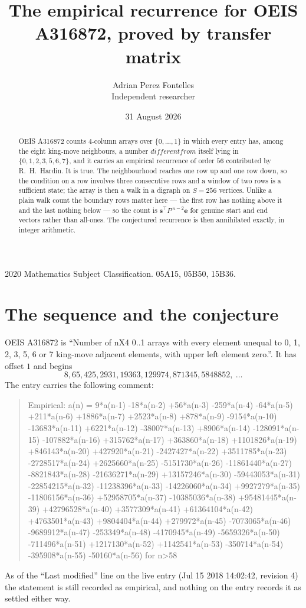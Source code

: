 \documentclass[11pt,a4paper]{article}
\title{The empirical recurrence for OEIS A316872, proved by transfer matrix}
\author{Adrian Perez Fontelles\\ \small Independent researcher}
\date{31 August 2026}
\theoremstyle{plain}
\theoremstyle{definition}
\begin{document}
\maketitle

\begin{abstract}
OEIS A316872 counts $4$-column arrays over $\{0,\dots,1\}$ in which every entry has,
among the eight king-move neighbours, a number $different from$ itself lying in $\{0,1,2,3,5,6,7\}$, and it carries an empirical
recurrence of order $56$ contributed by R.~H.~Hardin. It is true. The neighbourhood
reaches one row up and one row down, so the condition on a row involves three consecutive
rows and a window of two rows is a sufficient state; the array is then a walk in a digraph
on $S=256$ vertices. Unlike a plain walk count the boundary rows matter here --- the first
row has nothing above it and the last nothing below --- so the count is
$\mathbf{s}^{\!\top}P^{\,n-2}\mathbf{e}$ for genuine start and end vectors rather than
all-ones. The conjectured recurrence is then annihilated exactly, in integer arithmetic.
\end{abstract}

\noindent\small 2020 Mathematics Subject Classification. 05A15, 05B50, 15B36.\normalsize

\section{The sequence and the conjecture}

OEIS A316872 is ``Number of nX4 0..1 arrays with every element unequal to 0, 1, 2, 3, 5, 6 or 7 king-move adjacent elements, with upper left element zero.''. It has offset
$1$ and begins
\[
8, 65, 425, 2931, 19363, 129974, 871345, 5848852,\ \dots
\]
The entry carries the following comment:
\begin{quote}\small
Empirical: a(n) = 9*a(n-1) -18*a(n-2) +56*a(n-3) -259*a(n-4) -64*a(n-5) +211*a(n-6) +1886*a(n-7) +2523*a(n-8) +878*a(n-9) -9154*a(n-10) -13683*a(n-11) +6221*a(n-12) -38007*a(n-13) +8906*a(n-14) -128091*a(n-15) -107882*a(n-16) +315762*a(n-17) +363860*a(n-18) +1101826*a(n-19) +846143*a(n-20) +427920*a(n-21) -2427427*a(n-22) +3511785*a(n-23) -2728517*a(n-24) +2625660*a(n-25) -5151730*a(n-26) -11861440*a(n-27) -8821843*a(n-28) -21636271*a(n-29) +13157246*a(n-30) -59443053*a(n-31) -22854215*a(n-32) -11238396*a(n-33) -14226060*a(n-34) +9927279*a(n-35) -11806156*a(n-36) +52958705*a(n-37) -10385036*a(n-38) +95481445*a(n-39) +42796528*a(n-40) +3577309*a(n-41) +61364104*a(n-42) +4763501*a(n-43) +9804404*a(n-44) +279972*a(n-45) -7073065*a(n-46) -9689912*a(n-47) -253349*a(n-48) -4170945*a(n-49) -5659326*a(n-50) -711496*a(n-51) +1217130*a(n-52) +1142541*a(n-53) -350714*a(n-54) -395908*a(n-55) -50160*a(n-56) for n>58
\end{quote}
As of the ``Last modified'' line on the live entry (Jul 15 2018 14:02:42, revision
4) the statement is still recorded as empirical, and nothing on the entry
records it as settled either way.
\end{document}
